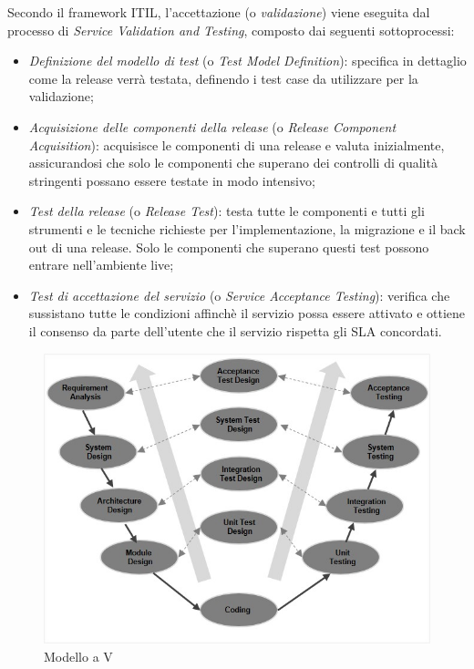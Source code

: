 	Secondo il framework ITIL, l'accettazione (o \textit{validazione}) viene eseguita dal processo di \textit{Service Validation and Testing}, composto dai seguenti sottoprocessi:
	\begin{itemize}[noitemsep]
		\item \textit{Definizione del modello di test} (o \textit{Test Model Definition}): specifica in dettaglio come la release verrà testata, definendo i test case da utilizzare per la validazione; 
		\item \textit{Acquisizione delle componenti della release} (o \textit{Release Component Acquisition}): acquisisce le componenti di una release e valuta inizialmente, assicurandosi che solo le componenti che superano dei controlli di qualità stringenti possano essere testate in modo intensivo;
		\item \textit{Test della release} (o \textit{Release Test}): testa tutte le componenti e tutti gli strumenti e le tecniche richieste per l’implementazione, la migrazione e il back out di una release. Solo le componenti che superano questi test possono entrare nell’ambiente live;
		\item \textit{Test di accettazione del servizio} (o \textit{Service Acceptance Testing}): verifica che sussistano tutte le condizioni affinchè il servizio possa essere attivato e ottiene il consenso da parte dell’utente che il servizio rispetta gli SLA concordati.
	\end{itemize}
	
	\begin{figure}[h!]
		\centering
		\includegraphics[width=\linewidth-2cm]{img/sdlc_v_model.jpeg}
		\caption{Modello a V\cite{vmodel}}
		\label{fig:vmodel}
	\end{figure}

